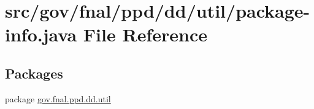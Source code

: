 \hypertarget{dd_2util_2package-info_8java}{\section{src/gov/fnal/ppd/dd/util/package-\/info.java File Reference}
\label{dd_2util_2package-info_8java}
}
\subsection*{Packages}
\begin{DoxyCompactItemize}
\item 
package \hyperlink{namespacegov_1_1fnal_1_1ppd_1_1dd_1_1util}{gov.\-fnal.\-ppd.\-dd.\-util}
\end{DoxyCompactItemize}
